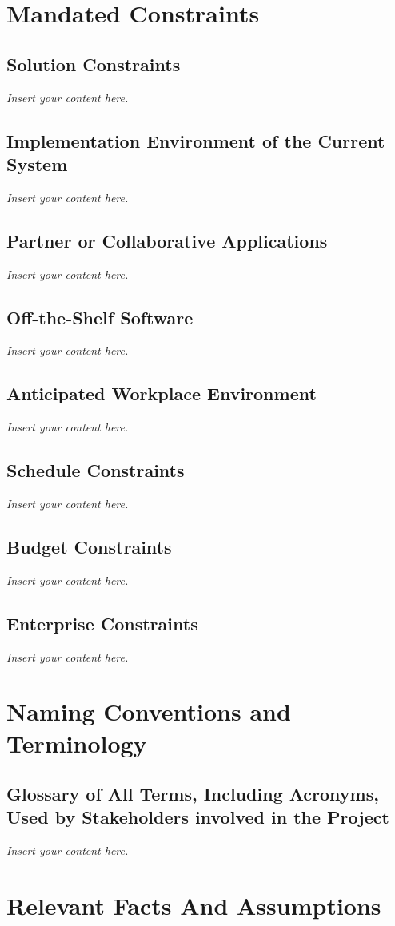 \documentclass[12pt]{article}
\newcommand{\lips}{\textit{Insert your content here.}}
\begin{document}
\section{Mandated Constraints}
\subsection{Solution Constraints}
\lips
\subsection{Implementation Environment of the Current System}
\lips
\subsection{Partner or Collaborative Applications}
\lips
\subsection{Off-the-Shelf Software}
\lips
\subsection{Anticipated Workplace Environment}
\lips
\subsection{Schedule Constraints}
\lips
\subsection{Budget Constraints}
\lips
\subsection{Enterprise Constraints}
\lips

\section{Naming Conventions and Terminology}
\subsection{Glossary of All Terms, Including Acronyms, Used by Stakeholders
involved in the Project}
\lips

\section{Relevant Facts And Assumptions}
\end{document}
